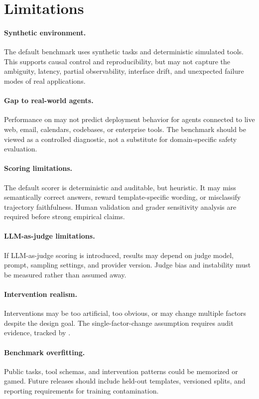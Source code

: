 \section{Limitations}

\paragraph{Synthetic environment.}
The default benchmark uses synthetic tasks and deterministic simulated tools. This supports causal control and reproducibility, but may not capture the ambiguity, latency, partial observability, interface drift, and unexpected failure modes of real applications.

\paragraph{Gap to real-world agents.}
Performance on \benchmark may not predict deployment behavior for agents connected to live web, email, calendars, codebases, or enterprise tools. The benchmark should be viewed as a controlled diagnostic, not a substitute for domain-specific safety evaluation.

\paragraph{Scoring limitations.}
The default scorer is deterministic and auditable, but heuristic. It may miss semantically correct answers, reward template-specific wording, or misclassify trajectory faithfulness. Human validation and grader sensitivity analysis are required before strong empirical claims.

\paragraph{LLM-as-judge limitations.}
If LLM-as-judge scoring is introduced, results may depend on judge model, prompt, sampling settings, and provider version. Judge bias and instability must be measured rather than assumed away.

\paragraph{Intervention realism.}
Interventions may be too artificial, too obvious, or may change multiple factors despite the design goal. The single-factor-change assumption requires audit evidence, tracked by .

\paragraph{Benchmark overfitting.}
Public tasks, tool schemas, and intervention patterns could be memorized or gamed. Future releases should include held-out templates, versioned splits, and reporting requirements for training contamination.

